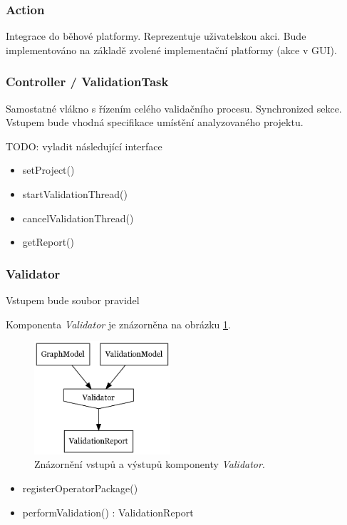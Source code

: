 \subsubsection{Action}
Integrace do běhové platformy. Reprezentuje uživatelskou akci. Bude implementováno na základě zvolené implementační platformy (akce v GUI).

\subsubsection{Controller / ValidationTask}
Samostatné vlákno s řízením celého validačního procesu. Synchronized sekce. Vstupem bude vhodná specifikace umístění analyzovaného projektu.

TODO: vyladit následující interface
\begin{itemize}
\item setProject()
\item startValidationThread()
\item cancelValidationThread()
\item getReport()
\end{itemize}

\subsubsection{Validator}
Vstupem bude soubor pravidel

Komponenta \emph{Validator} je znázorněna na obrázku \ref{design-validator_io}.

\begin{figure}[h!]
  \centering
  \includegraphics[width=0.45\textwidth]{./graphs/validator_io_graph.png}
  \caption{Znázornění vstupů a výstupů komponenty \emph{Validator}.\label{design-validator_io}}
\end{figure}

\begin{itemize}
\item registerOperatorPackage()
\item performValidation() : ValidationReport
\end{itemize}

